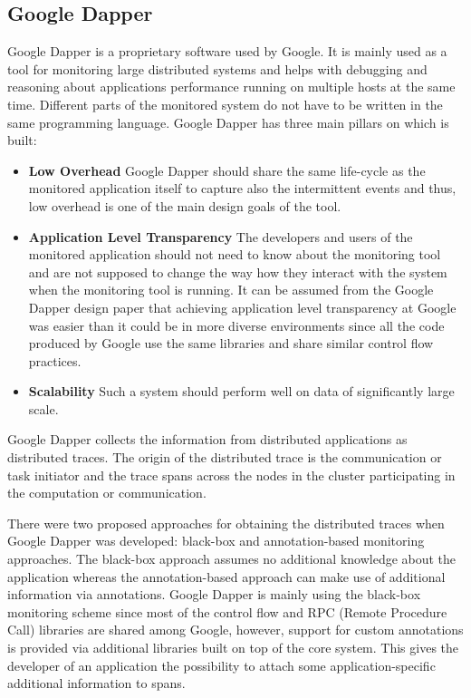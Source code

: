 \subsection{Google Dapper}
\label{dapper}
Google Dapper \cite{DapperPaper} is a proprietary software used by Google. It is mainly used as a tool for monitoring large distributed systems and helps with debugging and reasoning about applications performance running on multiple hosts at the same time. Different parts of the monitored system do not have to be written in the same programming language. Google Dapper has three main pillars on which is built:
\begin{itemize}
	\item \textbf{Low Overhead} \newline
	Google Dapper should share the same life-cycle as the monitored application itself to capture also the intermittent events and thus, low overhead is one of the main design goals of the tool.
	\item \textbf{Application Level Transparency} \newline
	The developers and users of the monitored application should not need to know about the monitoring tool and are not supposed to change the way how they interact with the system when the monitoring tool is running. It can be assumed from the Google Dapper design paper that achieving application level transparency at Google was easier than it could be in more diverse environments since all the code produced by Google use the same libraries and share similar control flow practices.
	\item \textbf{Scalability} \newline
	Such a system should perform well on data of significantly large scale.
\end{itemize}	
Google Dapper collects the information from distributed applications as distributed traces. The origin of the distributed trace is the communication or task initiator and the trace spans across the nodes in the cluster participating in the computation or communication.
	
There were two proposed approaches for obtaining the distributed traces when Google Dapper was developed: black-box and annotation-based monitoring approaches. The black-box approach assumes no additional knowledge about the application whereas the annotation-based approach can make use of additional information via annotations. Google Dapper is mainly using the black-box monitoring scheme since most of the control flow and RPC (Remote Procedure Call) libraries are shared among Google, however, support for custom annotations is provided via additional libraries built on top of the core system. This gives the developer of an application the possibility to attach some application-specific additional information to spans.
	
